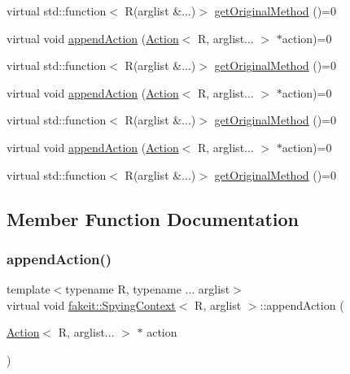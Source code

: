 \begin{DoxyCompactItemize}
\item 
virtual std\+::function$<$ R(arglist \&...)$>$ \mbox{\hyperlink{structfakeit_1_1SpyingContext_ad93f55614a19d084778f2ca96aca8037}{get\+Original\+Method}} ()=0
\item 
virtual void \mbox{\hyperlink{structfakeit_1_1SpyingContext_ae7eaf07b2bf6a451e5831bfa2769e9c6}{append\+Action}} (\mbox{\hyperlink{structfakeit_1_1Action}{Action}}$<$ R, arglist... $>$ $\ast$action)=0
\item 
virtual std\+::function$<$ R(arglist \&...)$>$ \mbox{\hyperlink{structfakeit_1_1SpyingContext_ad93f55614a19d084778f2ca96aca8037}{get\+Original\+Method}} ()=0
\item 
virtual void \mbox{\hyperlink{structfakeit_1_1SpyingContext_ae7eaf07b2bf6a451e5831bfa2769e9c6}{append\+Action}} (\mbox{\hyperlink{structfakeit_1_1Action}{Action}}$<$ R, arglist... $>$ $\ast$action)=0
\item 
virtual std\+::function$<$ R(arglist \&...)$>$ \mbox{\hyperlink{structfakeit_1_1SpyingContext_ad93f55614a19d084778f2ca96aca8037}{get\+Original\+Method}} ()=0
\item 
virtual void \mbox{\hyperlink{structfakeit_1_1SpyingContext_ae7eaf07b2bf6a451e5831bfa2769e9c6}{append\+Action}} (\mbox{\hyperlink{structfakeit_1_1Action}{Action}}$<$ R, arglist... $>$ $\ast$action)=0
\item 
virtual std\+::function$<$ R(arglist \&...)$>$ \mbox{\hyperlink{structfakeit_1_1SpyingContext_ad93f55614a19d084778f2ca96aca8037}{get\+Original\+Method}} ()=0
\end{DoxyCompactItemize}


\subsection{Member Function Documentation}
\mbox{\label{structfakeit_1_1SpyingContext_ae7eaf07b2bf6a451e5831bfa2769e9c6}} 
\subsubsection{\texorpdfstring{appendAction()}{appendAction()}\hspace{0.1cm}{\footnotesize\ttfamily [1/9]}}
{\footnotesize\ttfamily template$<$typename R, typename ... arglist$>$ \\
virtual void \mbox{\hyperlink{structfakeit_1_1SpyingContext}{fakeit\+::\+Spying\+Context}}$<$ R, arglist $>$\+::append\+Action (\begin{DoxyParamCaption}\item[{\mbox{\hyperlink{structfakeit_1_1Action}{Action}}$<$ R, arglist... $>$ $\ast$}]{action }\end{DoxyParamCaption})\hspace{0.3cm}{\ttfamily [pure virtual]}}



